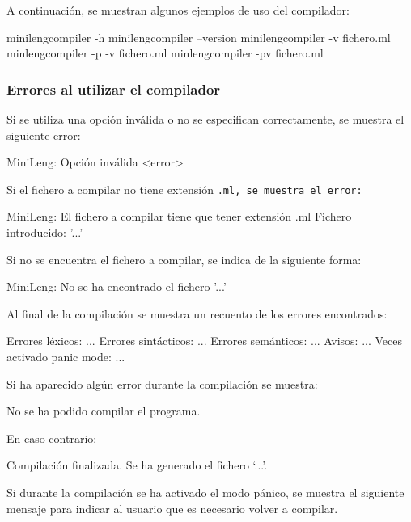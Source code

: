 A continuación, se muestran algunos ejemplos de uso del compilador:

\begin{codigo}
minilengcompiler -h
minilengcompiler --version
minilengcompiler -v fichero.ml
minlengcompiler -p -v fichero.ml
minlengcompiler -pv fichero.ml
\end{codigo}

\subsubsection{Errores al utilizar el compilador}
Si se utiliza una opción inválida o no se especifican correctamente, se muestra el siguiente error:

\begin{codigo}
MiniLeng: Opción inválida <error>
\end{codigo}

Si el fichero a compilar no tiene extensión \tt{.ml}, se muestra el error:

\begin{codigo}
MiniLeng: El fichero a compilar tiene que tener extensión .ml
          Fichero introducido: '...'
\end{codigo}

Si no se encuentra el fichero a compilar, se indica de la siguiente forma:

\begin{codigo}
MiniLeng: No se ha encontrado el fichero '...'
\end{codigo}

Al final de la compilación se muestra un recuento de los errores encontrados:

\begin{codigo}
Errores léxicos: ...
Errores sintácticos: ...
Errores semánticos: ...
Avisos: ...
Veces activado panic mode: ...
\end{codigo}

Si ha aparecido algún error durante la compilación se muestra:

\begin{codigo}
No se ha podido compilar el programa.
\end{codigo}

En caso contrario:

\begin{codigo}
Compilación finalizada. Se ha generado el fichero `...'.
\end{codigo}

Si durante la compilación se ha activado el modo pánico, se muestra el siguiente mensaje para indicar al usuario que es necesario volver a compilar.

